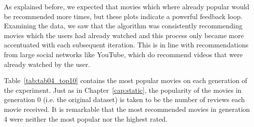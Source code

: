 As explained before, we expected that movies which where already popular would
be recommended more times, but these plots indicate a powerful feedback loop.
Examining the data, we saw that the algorithm was consistently recommending
movies which the users had already watched and this process only became more
accentuated with each subsequent iteration. This is in line with recommendations
from large social networks like YouTube, which do recommend videos that were
already watched by the user.

Table~\ref{tab:tab04_top10} contains the most popular movies on each generation
of the experiment. Just as in Chapter~\ref{cap:static}, the popularity of the
movies in generation 0 (i.e. the original dataset) is taken to be the number of
reviews each movie received. It is remarkable that the most recommended movies
in generation 4 were neither the most popular nor the highest rated.


